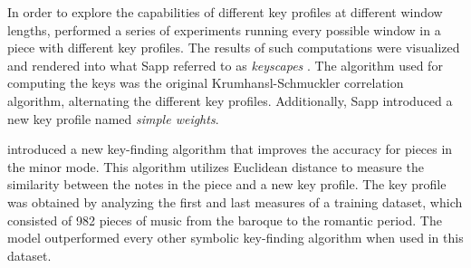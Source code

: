 




In order to explore the capabilities of different key
profiles at different window lengths,
\textcite{sapp2011computational} performed a series of
experiments running every possible window in a piece with
different key profiles. The results of such computations
were visualized and rendered into what Sapp referred to as
\emph{keyscapes} \parencite{sapp2001harmonic}. The algorithm
used for computing the keys was the original
Krumhansl-Schmuckler correlation algorithm, alternating the
different key profiles. Additionally, Sapp introduced a new
key profile named \emph{simple weights}.

\textcite{albrecht2013use} introduced a new key-finding
algorithm that improves the accuracy for pieces in the minor
mode. This algorithm utilizes Euclidean distance to measure
the similarity between the notes in the piece and a new key
profile. The key profile was obtained by analyzing the first
and last measures of a training dataset, which consisted of
982 pieces of music from the baroque to the romantic period.
The model outperformed every other symbolic key-finding
algorithm when used in this dataset.

